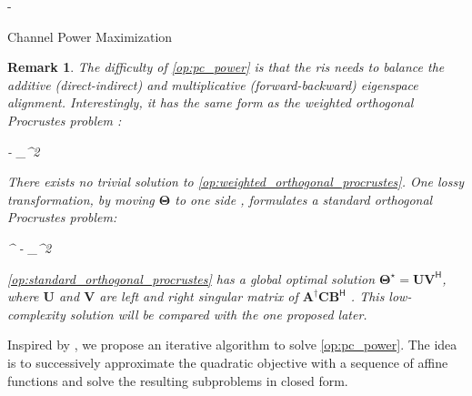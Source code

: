 \documentclass[journal]{IEEEtran}
\newtheorem{remark}{Remark}
\begin{document}
\begin{section}{-}
\begin{subsection}{Channel Power Maximization}
		\begin{remark}
			The difficulty of \eqref{op:pc_power} is that the \gls{ris} needs to balance the additive (direct-indirect) and multiplicative (forward-backward) eigenspace alignment.
			Interestingly, it has the same form as the \emph{weighted orthogonal Procrustes problem} \cite{Gower2004}:
			\begin{mini!}
				{\scriptstyle{\mathbf{\Theta}}}{\lVert {} -  \rVert _^2}{\label{op:weighted_orthogonal_procrustes}}{}
			\end{mini!}
			There exists no trivial solution to \eqref{op:weighted_orthogonal_procrustes}.
			One lossy transformation, by moving $\mathbf{\Theta}$ to one side \cite{Bell2003}, formulates a standard orthogonal Procrustes problem:
			\begin{mini!}
				{\scriptstyle{\mathbf{\Theta}}}{\lVert {}^\dagger {} -  \rVert _^2}{\label{op:standard_orthogonal_procrustes}}{}
				\addConstraint{\mathbf{\Theta}^\mathsf{H} \mathbf{\Theta}=\mathbf{I}.}{}{}
			\end{mini!}
			\eqref{op:standard_orthogonal_procrustes} has a global optimal solution $\mathbf{\Theta}^\star = \mathbf{U} \mathbf{V}^\mathsf{H}$, where $\mathbf{U}$ and $\mathbf{V}$ are left and right singular matrix of $\mathbf{\mathbf{A}^\dagger \mathbf{C} \mathbf{B}^\mathsf{H}}$ \cite{Golub2013}.
			This low-complexity solution will be compared with the one proposed later.
		\end{remark}

		Inspired by \cite{Nie2017}, we propose an iterative algorithm to solve \eqref{op:pc_power}.
		The idea is to successively approximate the quadratic objective with a sequence of affine functions and solve the resulting subproblems in closed form.


\end{subsection}
\end{section}
\end{document}
